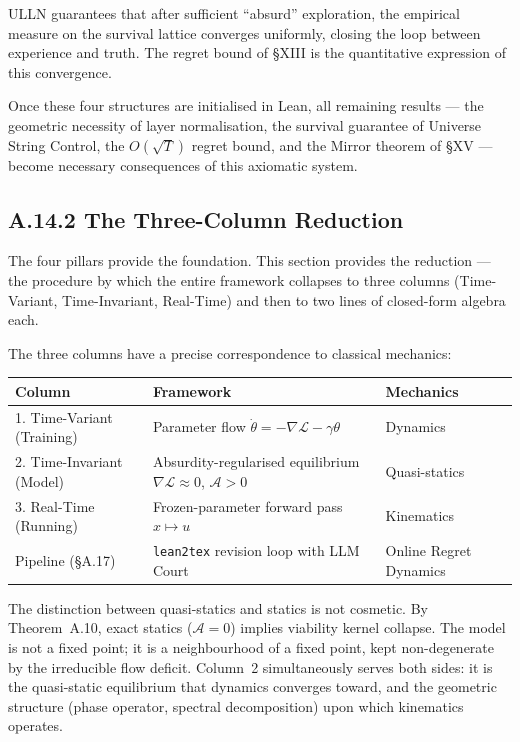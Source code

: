 \documentclass[11pt,a4paper]{article}
\theoremstyle{definition}
\theoremstyle{remark}
\begin{document}
ULLN guarantees that after sufficient ``absurd'' exploration, the empirical measure on the survival lattice converges uniformly, closing the loop between experience and truth. The regret bound of \S XIII is the quantitative expression of this convergence.

Once these four structures are initialised in Lean, all remaining results --- the geometric necessity of layer normalisation, the survival guarantee of Universe String Control, the $O(\sqrt{T})$ regret bound, and the Mirror theorem of \S XV --- become necessary consequences of this axiomatic system.


\subsection{A.14.2 The Three-Column Reduction}

The four pillars provide the foundation. This section provides the reduction --- the procedure by which the entire framework collapses to three columns (Time-Variant, Time-Invariant, Real-Time) and then to two lines of closed-form algebra each.

The three columns have a precise correspondence to classical mechanics:
\begin{center}
\small
\begin{tabularx}{\textwidth}{l X l}
\toprule
\textbf{Column} & \textbf{Framework} & \textbf{Mechanics} \\
\midrule
1. Time-Variant (Training) & Parameter flow $\dot{\theta} = -\nabla\mathcal{L} - \gamma\theta$ & Dynamics \\
2. Time-Invariant (Model) & Absurdity-regularised equilibrium $\nabla\mathcal{L} \approx 0$, $\mathcal{A} > 0$ & Quasi-statics \\
3. Real-Time (Running) & Frozen-parameter forward pass $x \mapsto u$ & Kinematics \\
\midrule
Pipeline (\S A.17) & \texttt{lean2tex} revision loop with LLM Court & Online Regret Dynamics \\
\bottomrule
\end{tabularx}
\end{center}
The distinction between quasi-statics and statics is not cosmetic. By Theorem~A.10, exact statics ($\mathcal{A} = 0$) implies viability kernel collapse. The model is not a fixed point; it is a neighbourhood of a fixed point, kept non-degenerate by the irreducible flow deficit. Column~2 simultaneously serves both sides: it is the quasi-static equilibrium that dynamics converges toward, and the geometric structure (phase operator, spectral decomposition) upon which kinematics operates.
\end{document}
